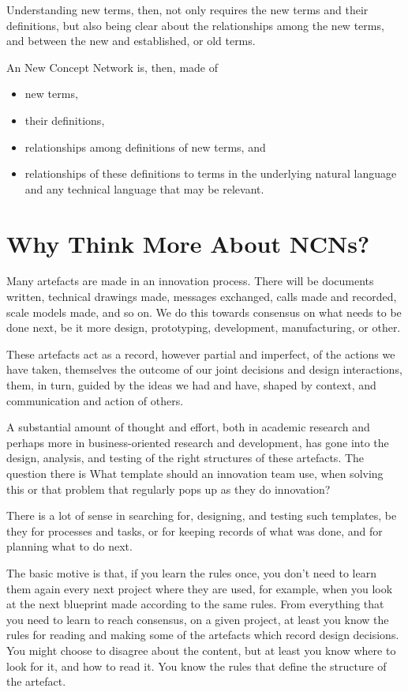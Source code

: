 \documentclass[graybox,envcountchap,sectrefs]{svmono}
\newcommand{\ncn}{NCN}
\newcommand{\ncnf}{New Concept Network}
\begin{document}
Understanding new terms, then, not only requires the new terms and their definitions, but also being clear about the relationships among the new terms, and between the new and established, or old terms. 

An \ncnf{} is, then, made of 
\begin{itemize}
	\item new terms,
	\item their definitions, 
	\item relationships among definitions of new terms, and 
	\item relationships of these definitions to terms in the underlying natural language and any technical language that may be relevant.
\end{itemize}

\section{Why Think More About \ncn s?}
\label{c1-s11}
Many artefacts are made in an innovation process. There will be documents written, technical drawings made, messages exchanged, calls made and recorded, scale models made, and so on. We do this towards consensus on what needs to be done next, be it more design, prototyping, development, manufacturing, or other.

These artefacts act as a record, however partial and imperfect, of the actions we have taken, themselves the outcome of our joint decisions and design interactions, them, in turn, guided by the ideas we had and have, shaped by context, and communication and action of others. 

A substantial amount of thought and effort, both in academic research and perhaps more in business-oriented research and development, has gone into the design, analysis, and testing of the right structures of these artefacts. The question there is What template should an innovation team use, when solving this or that problem that regularly pops up as they do innovation? 

There is a lot of sense in searching for, designing, and testing such templates, be they for processes and tasks, or for keeping records of what was done, and for planning what to do next. 

The basic motive is that, if you learn the rules once, you don't need to learn them again every next project where they are used, for example, when you look at the next blueprint made according to the same rules. From everything that you need to learn to reach consensus, on a given project, at least you know the rules for reading and making some of the artefacts which record design decisions. You might choose to disagree about the content, but at least you know where to look for it, and how to read it. You know the rules that define the structure of the artefact.
\end{document}
